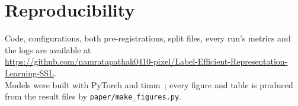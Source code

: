\documentclass[conference]{IEEEtran}
\begin{document}
\section*{Reproducibility}
Code, configurations, both pre-registrations, split files, every run's metrics and the logs are available at\\
{\footnotesize\url{https://github.com/namratapathak0410-pixel/Label-Efficient-Representation-Learning-SSL}}.\\
Models were built with PyTorch and timm~\cite{wightman2019timm}; every figure and table is produced from the result
files by \texttt{paper/make\_figures.py}.



\end{document}
